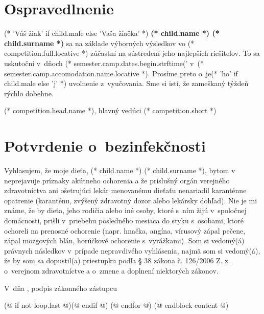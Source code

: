         \cutHere

        \section{Ospravedlnenie}
            (* 'Váš žiak' if child.male else 'Vaša žiačka' *) \textbf{(* child.name *) (* child.surname *)}
            sa na základe výborných výsledkov vo (* competition.full.locative *)
            zúčastní na sústredení jeho najlepších riešiteľov. To sa uskutoční v~dňoch
            (* semester.camp.dates.begin.strftime('%
            v~(* semester.camp.accomodation.name.locative *). Prosíme preto o~je(* 'ho' if child.male else 'j' *) uvoľnenie z~vyučovania.
            Sme si istí, že zameškaný týždeň rýchlo dobehne.
            \vspace{5mm}

            \hfill (* competition.head.name *), hlavný vedúci (* competition.short *)
        
        \cutHere

        \section{Potvrdenie o~bezinfekčnosti}
            Vyhlasujem, že moje dieťa, (* child.name *) (* child.surname *), bytom v~\makebox[30mm]{\dotfill} neprejavuje príznaky akútneho ochorenia a že
            príslušný orgán verejného zdravotníctva ani ošetrujúci lekár menovanému dieťaťu nenariadil
            karanténne opatrenie (karanténu, zvýšený zdravotný dozor alebo lekársky dohľad). Nie je mi známe, že
            by dieťa, jeho rodičia alebo iné osoby, ktoré s~ním žijú v~spoločnej domácnosti, prišli v~priebehu
            posledného mesiaca do styku s~osobami, ktoré ochoreli na prenosné ochorenie (napr. hnačka, angína,
            vírusový zápal pečene, zápal mozgových blán, horúčkové ochorenie s~vyrážkami). Som si
            vedomý(á) právnych následkov v~prípade nepravdivého vyhlásenia, najmä som si vedomý(á), že by som sa
            dopustil(a) priestupku podľa § 38 zákona č. 126/2006 Z. z. o~verejnom zdravotníctve a o~zmene a
            doplnení niektorých zákonov.
            \vspace{5mm}

            V~\dotfill dňa \dotfill, \hfill podpis zákonného zástupcu \dotfill
            \vspace*{5mm}

        \cutHere
        (@ if not loop.last @)\newpage(@ endif @)
    (@ endfor @)
(@ endblock content @)
